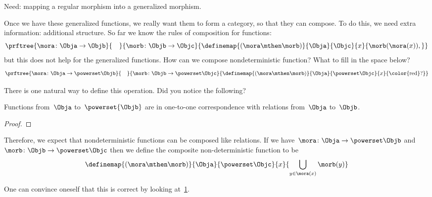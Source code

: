 Need: mapping a regular morphism into a generalized morphism.

Once we have these generalized functions, we really want them to form a category, so that they can compose. To do this, we need extra information: additional structure.
So far we know the rules of composition for functions:
% 
\begin{equation}\label{eq:monad-function-composition}
    \prftree{\mora\colon \Obja \to \Objb}{\quad}{\morb\colon \Objb \to \Objc}
    {\definemap{(\mora\mthen\morb)}{\Obja}{\Objc}%
    {x}{\morb(\mora(x)),}}
  \end{equation}
%   
but this does not help for the generalized functions. How can we compose nondeterministic function? What to fill in the space below?
% 
\begin{equation}\label{eq:monad-gen-function-composition}
    \prftree{\mora\colon \Obja \to \powerset\Objb}{\quad}{\morb\colon \Objb \to \powerset \Objc}
    {\definemap{(\mora\mthen\morb)}{\Obja}{\powerset\Objc}%
    {x}{\text{\color{red}?}}}
  \end{equation}

There is one natural way to define this operation. 
Did you notice the following?

\begin{lemma}\label{lem:powersets-relations}
Functions from~$\Obja$ to~$\powerset{\Objb}$ are in one-to-one correspondence with relations from~$\Obja$ to~$\Objb$.
\end{lemma}

\begin{proof}
\end{proof}

Therefore, we expect that nondeterministic functions can be composed like relations.
If we have~$\mora\colon \Obja \to \powerset\Objb$ and~$\morb\colon \Objb \to \powerset \Objc$ then we define the composite non-deterministic function to be
%
\begin{equation}\label{eq:fish-nondet}
    \definemap{(\mora\mthen\morb)}{\Obja}{\powerset\Objc}%
    {x}{ \displaystyle \bigcup_{y\in \mora(x)}\morb(y)}
\end{equation}

One can convince oneself that this is correct by looking at~\cref{fig:mapping-nondeterministic}.

\begin{figure}[h]
    \caption{}
    \label{fig:mapping-nondeterministic}
\end{figure}

